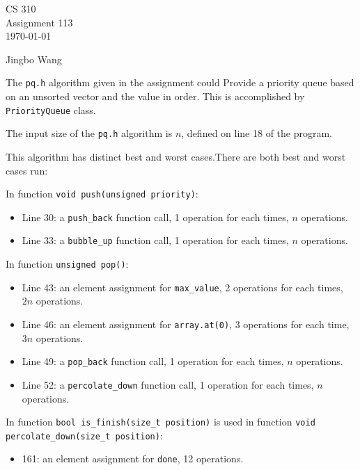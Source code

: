 \documentclass[11pt]{article}
\newcommand{\name}{Jingbo Wang}
\begin{document}
\thispagestyle{empty}

\begin{center}
{\large CS 310}\\
Assignment 113\\
\today
\end{center}

\begin{flushright}
\name{}
\end{flushright}

The \texttt{pq.h} algorithm given in the assignment could Provide a priority 
queue based on an unsorted vector and the value in order. This is accomplished 
by \texttt{PriorityQueue} class.

The input size of the \texttt{pq.h} algorithm is $n$, defined on line 18 of 
the program.  

This algorithm has distinct best and worst cases.There are both best and worst 
cases run:

In function \texttt{void push(unsigned priority)}:
\begin{itemize}
    \item Line 30: a \texttt{push\_back} function call, 1 operation for each times, 
                   $n$ operations.
    \item Line 33: a \texttt{bubble\_up} function call, 1 operation for each times, 
                   $n$ operations.
\end{itemize}
In function \texttt{unsigned pop()}:
\begin{itemize}
    \item Line 43: an element assignment for \texttt{max\_value}, 2 operations for  
                   each times, $2n$ operations.
    \item Line 46: an element assignment for \texttt{array.at(0)}, 3 operations for  
                   each time, $3n$ operations.
    \item Line 49: a \texttt{pop\_back} function call, 1 operation for each times, 
                   $n$ operations. 
    \item Line 52: a \texttt{percolate\_down} function call, 1 operation for 
                   each times, $n$ operations.               
\end{itemize}
In function \texttt{bool is\_finish(size\_t position)} is used in function 
\texttt{void percolate\_down(size\_t position)}:

\begin{itemize}
    \item 161: an element assignment for \texttt{done}, 12 operations.
\end{itemize}
\end{document}
